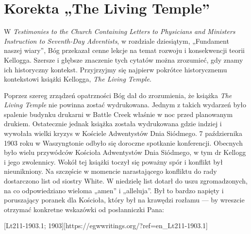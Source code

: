 \chapter{Korekta „The Living Temple”}

W \textit{Testimonies to the Church Containing Letters to Physicians and Ministers Instruction to Seventh-Day Adventists}, w rozdziale dziesiątym, „Fundament naszej wiary”, Bóg przekazał cenne lekcje na temat rozwoju i konsekwencji teorii Kellogga. Szersze i głębsze znaczenie tych cytatów można zrozumieć, gdy znamy ich historyczny kontekst. Przyjrzyjmy się najpierw pokrótce historycznemu kontekstowi książki Kellogga, \textit{The Living Temple}.

Poprzez szereg zrządzeń opatrzności Bóg dał do zrozumienia, że książka \textit{The Living Temple} nie powinna zostać wydrukowana. Jednym z takich wydarzeń było spalenie budynku drukarni w Battle Creek właśnie w noc przed planowanym drukiem. Ostatecznie jednak książka została wydrukowana gdzie indziej i wywołała wielki kryzys w Kościele Adwentystów Dnia Siódmego. 7 października 1903 roku w Waszyngtonie odbyło się doroczne spotkanie konferencji. Obecnych było wielu przywódców Kościoła Adwentystów Dnia Siódmego, w tym dr Kellogg i jego zwolennicy. Wokół tej książki toczył się poważny spór i konflikt był nieunikniony. Na szczęście w momencie narastającego konfliktu do rady dostarczono list od siostry White. W niedzielę list dotarł do uszu zgromadzonych, na co odpowiedziano wieloma „amen” i „alleluja”. Był to bardzo napięty i poruszający poranek dla Kościoła, który był na krawędzi rozłamu — by wreszcie otrzymać konkretne wskazówki od posłanniczki Pana:

[Lt211-1903.1; 1903][https://egwwritings.org/?ref=en\_Lt211-1903.1]

